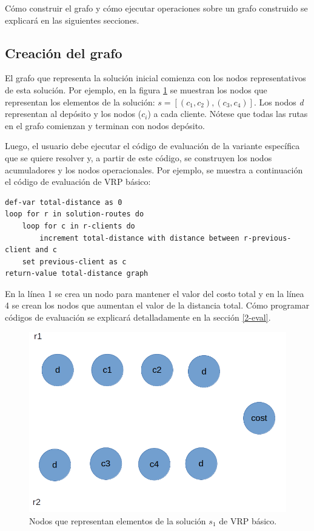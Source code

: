 Cómo construir el grafo y cómo ejecutar operaciones sobre un grafo construido se explicará en las siguientes secciones.

\subsection{Creación del grafo}

El grafo que representa la solución inicial comienza con los nodos representativos de esta solución. Por ejemplo, en la figura \ref{fig:eval-graph-1} se muestran los nodos que representan los elementos de la solución: $s = [(c_1,c_2), (c_3,c_4)]$. Los nodos \textit{d} representan al depósito y los nodos (\textit{$c_i$}) a cada cliente. Nótese que todas las rutas en el grafo comienzan y terminan con nodos depósito.

Luego, el usuario debe ejecutar el código de evaluación de la variante específica que se quiere resolver y, a partir de este código, se construyen los nodos acumuladores y los nodos operacionales. Por ejemplo, se muestra a continuación el código de evaluación de VRP básico:

\begin{lstlisting}
def-var total-distance as 0
loop for r in solution-routes do
	loop for c in r-clients do
		increment total-distance with distance between r-previous-client and c
	set previous-client as c
return-value total-distance graph
\end{lstlisting}

En la línea 1 se crea un nodo para mantener el valor del costo total y en la línea 4 se crean los nodos que aumentan el valor de la distancia total. Cómo programar códigos de evaluación se explicará detalladamente en la sección \ref{2-eval}.

\begin{figure}
	\centering
	\includegraphics[width=0.9\linewidth]{Graphics/eval-graph-1}
	\caption{Nodos que representan elementos de la solución $s_1$ de VRP básico.}
	\label{fig:eval-graph-1}
\end{figure}

